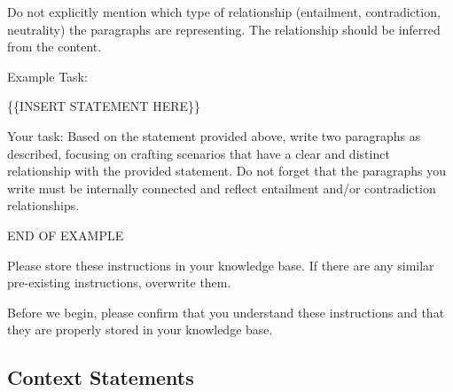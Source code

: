 \documentclass[fleqn,moreauthors,10pt]{ds_report}
\begin{document}
Do not explicitly mention which type of relationship (entailment, contradiction, neutrality) the paragraphs are representing. The relationship should be inferred from the content.

Example Task:

\{\{INSERT STATEMENT HERE\}\}

Your task: Based on the statement provided above, write two paragraphs as described, focusing on crafting scenarios that have a clear and distinct relationship with the provided statement. Do not forget that the paragraphs you write must be internally connected and reflect entailment and/or contradiction relationships.

END OF EXAMPLE

Please store these instructions in your knowledge base. If there are any similar pre-existing instructions, overwrite them.

Before we begin, please confirm that you understand these instructions and that they are properly stored in your knowledge base.

\subsection{Context Statements}
\end{document}
